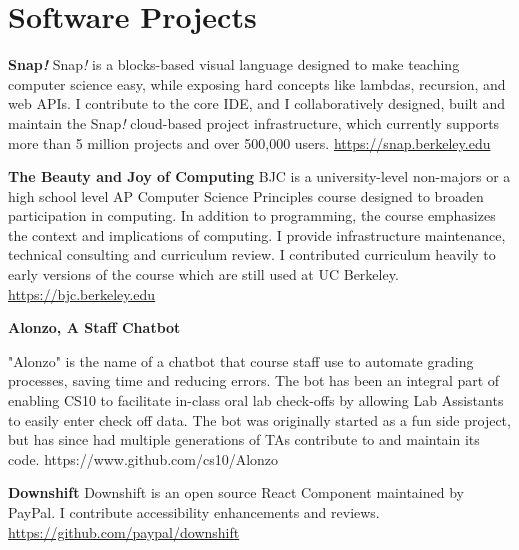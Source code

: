 \section{Software Projects}

\vspace{6pt}

\textbf{Snap\textit{!}}
\linebreak
\small Snap\textit{!} is a blocks-based visual language designed to make teaching computer science easy, while exposing hard concepts like lambdas, recursion, and web APIs. I contribute to the core IDE, and I collaboratively designed, built and maintain the Snap\textit{!} cloud-based project infrastructure, which currently supports more than 5 million projects and over 500,000 users.
\newline
\small{\href{https://snap.berkeley.edu}{https://snap.berkeley.edu}}

\vspace{12pt}

\textbf{The Beauty and Joy of Computing}
\newline
\small BJC is a university-level non-majors or a high school level AP Computer Science Principles course designed to broaden participation in computing. In addition to programming, the course emphasizes the context and implications of computing. I provide infrastructure maintenance, technical consulting and curriculum review. I contributed curriculum heavily to early versions of the course which are still used at UC Berkeley.
\newline
\small{\href{https://bjc.berkeley.edu}{https://bjc.berkeley.edu}}

\vspace{12pt}

\textbf{Alonzo, A Staff Chatbot}

\vspace{3pt}

\small{"Alonzo" is the name of a chatbot that course staff use to automate grading processes, saving time and reducing errors. The bot has been an integral part of enabling CS10 to facilitate in-class oral lab check-offs by allowing Lab Assistants to easily enter check off data. The bot was originally started as a fun side project, but has since had multiple generations of TAs contribute to and maintain its code.}
\linebreak
\small{https://www.github.com/cs10/Alonzo}

\vspace{12pt}
\textbf{Downshift}
\newline
\small{Downshift is an open source React Component maintained by PayPal. I contribute accessibility enhancements and reviews.}
\newline
\small{\href{https://github.com/paypal/downshift}{https://github.com/paypal/downshift}}

\vspace{15pt}

